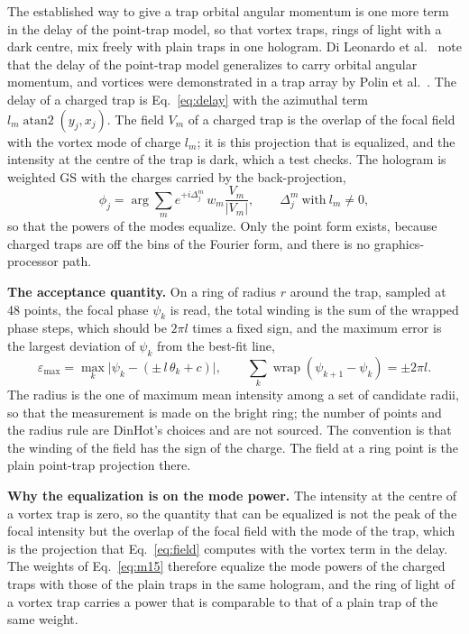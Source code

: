 The established way to give a trap orbital angular momentum is one more term in the delay of the point-trap model, so that vortex traps, rings of light with a dark centre, mix freely with plain traps in one hologram. Di Leonardo et al.~\cite{dileonardo} note that the delay of the point-trap model generalizes to carry orbital angular momentum, and vortices were demonstrated in a trap array by Polin et al.~\cite{polin}. The delay of a charged trap is Eq.~\eqref{eq:delay} with the azimuthal term $l_m\operatorname{atan2}(y_j,x_j)$. The field $V_m$ of a charged trap is the overlap of the focal field with the vortex mode of charge $l_m$; it is this projection that is equalized, and the intensity at the centre of the trap is dark, which a test checks. The hologram is weighted GS with the charges carried by the back-projection,
\begin{equation}
\phi_j=\arg\sum_m e^{+i\Delta_j^m}\,w_m\frac{V_m}{|V_m|},\qquad \Delta_j^m\ \text{with}\ l_m\neq0,
\label{eq:m15}
\end{equation}
so that the powers of the modes equalize. Only the point form exists, because charged traps are off the bins of the Fourier form, and there is no graphics-processor path.

\textbf{The acceptance quantity.} On a ring of radius $r$ around the trap, sampled at 48 points, the focal phase $\psi_k$ is read, the total winding is the sum of the wrapped phase steps, which should be $2\pi l$ times a fixed sign, and the maximum error is the largest deviation of $\psi_k$ from the best-fit line,
\begin{equation}
\varepsilon_{\max}=\max_k\big|\psi_k-(\pm\,l\,\theta_k+c)\big|,\qquad \sum_k\operatorname{wrap}(\psi_{k+1}-\psi_k)=\pm2\pi l.
\label{eq:m15-ring}
\end{equation}
The radius is the one of maximum mean intensity among a set of candidate radii, so that the measurement is made on the bright ring; the number of points and the radius rule are DinHot's choices and are not sourced. The convention is that the winding of the field has the sign of the charge. The field at a ring point is the plain point-trap projection there.

\textbf{Why the equalization is on the mode power.} The intensity at the centre of a vortex trap is zero, so the quantity that can be equalized is not the peak of the focal intensity but the overlap of the focal field with the mode of the trap, which is the projection that Eq.~\eqref{eq:field} computes with the vortex term in the delay. The weights of Eq.~\eqref{eq:m15} therefore equalize the mode powers of the charged traps with those of the plain traps in the same hologram, and the ring of light of a vortex trap carries a power that is comparable to that of a plain trap of the same weight.

